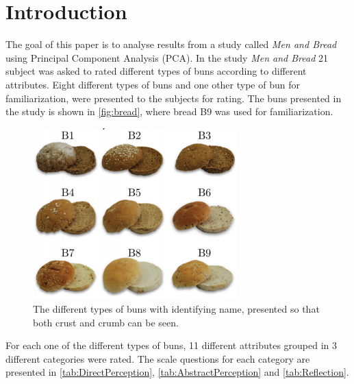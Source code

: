 \chapter*{Introduction}
\label{introduction}
%
The goal of this paper is to analyse results from a study called \textit{Men and Bread} using Principal Component Analysis (PCA). \blankline
% 
In the study \textit{Men and Bread} 21 subject was asked to rated different types of buns according to different attributes. Eight different types of buns and one other type of bun for familiarization, were presented to the subjects for rating. The buns presented in the study is shown in \autoref{fig:bread}, where bread B9 was used for familiarization. 
%
\begin{figure}[H]
\centering
\includegraphics[width =0.7\textwidth]{Figure/Bread}
\caption{The different types of buns with identifying name, presented so that both crust and crumb can be seen.}
\label{fig:bread}
\end{figure}
\noindent
%
For each one of the different types of buns, 11 different attributes grouped in 3 different categories were rated. The scale questions for each category are presented in \autoref{tab:DirectPerception}, \autoref{tab:AbstractPerception} and \autoref{tab:Reflection}.

